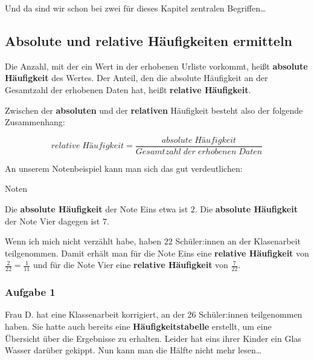 \documentclass[
  ngerman,
]{book}
\begin{document}
Und da sind wir schon bei zwei für dieses Kapitel zentralen Begriffen\ldots{}

\hypertarget{absolute-und-relative-huxe4ufigkeiten-ermitteln}{%
\subsection*{Absolute und relative Häufigkeiten ermitteln}\label{absolute-und-relative-huxe4ufigkeiten-ermitteln}}

Die Anzahl, mit der ein Wert in der erhobenen Urliste vorkommt, heißt \textbf{absolute Häufigkeit} des Wertes. Der Anteil, den die absolute Häufigkeit an der Gesamtzahl der erhobenen Daten hat, heißt \textbf{relative Häufigkeit}.

Zwischen der \textbf{absoluten} und der \textbf{relativen} Häufigkeit besteht also der folgende Zusammenhang:

\[relative \; Häufigkeit = \frac{absolute \; Häufigkeit}{Gesamtzahl\; der\; erhobenen\; Daten}\]

An unserem Notenbeispiel kann man sich das gut verdeutlichen:

Noten

Die \textbf{absolute Häufigkeit} der Note Eins etwa ist \(2\). Die \textbf{absolute Häufigkeit} der Note Vier dagegen ist \(7\).

Wenn ich mich nicht verzählt habe, haben \(22\) Schüler:innen an der Klasenarbeit teilgenommen. Damit erhält man für die Note Eins eine \textbf{relative Häufigkeit} von \(\frac{2}{22} = \frac{1}{11}\) und für die Note Vier eine \textbf{relative Häufigkeit} von \(\frac{7}{22}\).

\hypertarget{section-7}{%
\subsubsection*{}\label{section-7}}

\hypertarget{aufgabe-1-1}{%
\subsubsection*{Aufgabe 1}\label{aufgabe-1-1}}

Frau D. hat eine Klassenarbeit korrigiert, an der 26 Schüler:innen teilgenommen haben. Sie hatte auch bereits eine \textbf{Häufigkeitstabelle} erstellt, um eine Übersicht über die Ergebnisse zu erhalten. Leider hat eins ihrer Kinder ein Glas Wasser darüber gekippt. Nun kann man die Hälfte nicht mehr lesen\ldots{}
\end{document}
